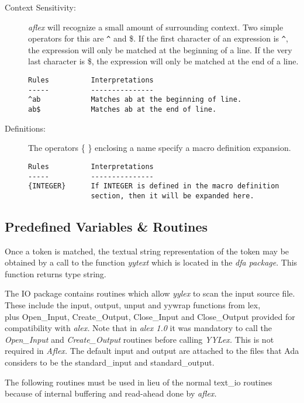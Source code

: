 \begin{description}
  \item[Context Sensitivity:]  {\sl aflex} will recognize a small amount of
      surrounding context.  Two simple operators for this are \verb|^| and
      \$.  If the first character of an expression is \verb|^|, the expression
      will  only  be  matched at the beginning of a line.  If the very
      last character is \$, the expression will only be matched at  the
      end  of  a line.  

\small
\begin{verbatim}
Rules          Interpretations
-----          ---------------
^ab            Matches ab at the beginning of line.
ab$            Matches ab at the end of line.
\end{verbatim}
\normalsize


  \item[Definitions:]  The operators  \{ \}  enclosing a name
      specify a macro definition expansion.

\small
\begin{verbatim}
Rules          Interpretations
-----          ---------------
{INTEGER}      If INTEGER is defined in the macro definition
               section, then it will be expanded here.
\end{verbatim}
\normalsize
\end{description}


\subsection{Predefined Variables \& Routines}
\label {routines}
Once a token is matched, the textual string representation of the token
may be obtained by a call to the function {\sl yytext} which is located
in the {\sl dfa package}.  This function returns type string.

\mysk
The IO package contains
routines which allow {\sl yylex} to scan the input source file.
These include the input, output, unput and yywrap functions
from lex,\\ plus Open\_Input, Create\_Output, Close\_Input and Close\_Output
provided for compatibility with {\sl alex.}  Note that in {\sl alex
1.0} it was mandatory to call the {\it Open\_Input} and {\it
Create\_Output} routines before calling {\it YYLex.}  This is not
required in {\sl Aflex.}  The default input and output are attached to
the files that Ada considers to be the {\sc standard\_input} and
{\sc standard\_output. }

The following routines must be used in lieu of the normal {\sc
text\_io} routines because of internal buffering and read-ahead done by
{\sl aflex.} 

